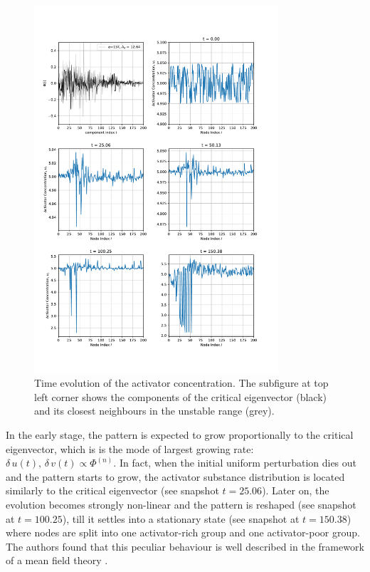 \begin{figure}[H]
    \centering
    \includegraphics[width = 0.81\textwidth]{latex_source/images/turing/snapshots.pdf}
    \caption{ Time evolution of the activator concentration. The subfigure at top left corner shows the components of the critical eigenvector (black) and its closest neighbours in the unstable range (grey).}
    \label{fig:snapshots}
\end{figure}
In the early stage, the pattern is expected to grow proportionally to the critical eigenvector, which is is the mode of largest growing rate: $\delta\,u(t),\, \delta\,v(t) \propto \Phi^{(n)}$.
In fact, when the initial uniform perturbation dies out and the pattern starts to grow, the activator substance distribution is located similarly to the critical eigenvector (see snapshot $t = 25.06$). Later on, the evolution becomes strongly non-linear and the pattern is reshaped (see snapshot at $t = 100.25$), till it settles into a stationary state (see snapshot at $t = 150.38$) where nodes are split into one activator-rich group and one activator-poor group. The authors found that this peculiar behaviour is well described in the framework of a mean field theory \cite{main_network}. \medskip \newline \noindent
